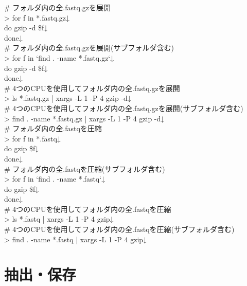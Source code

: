 \documentclass[titlepage,10pt,a4paper,english]{jsbook}
\newenvironment{cmd}{\begin{oframed}\raggedright\ttfamily\footnotesize\setlength{\baselineskip}{1.4em}}{\end{oframed}\vspace{-1em}}
\begin{document}
\begin{cmd}
\# フォルダ内の全.fastq.gzを展開\\
{\textgreater} for f in *.fastq.gz↓\\
do gzip -d \$f↓\\
done↓\\
\# フォルダ内の全.fastq.gzを展開(サブフォルダ含む)\\
{\textgreater} for f in `find . -name *.fastq.gz`↓\\
do gzip -d \$f↓\\
done↓\\
\# 4つのCPUを使用してフォルダ内の全.fastq.gzを展開\\
{\textgreater} ls *.fastq.gz | xargs -L 1 -P 4 gzip -d↓\\
\# 4つのCPUを使用してフォルダ内の全.fastq.gzを展開(サブフォルダ含む)\\
{\textgreater} find . -name *.fastq.gz | xargs -L 1 -P 4 gzip -d↓\\
\# フォルダ内の全.fastqを圧縮\\
{\textgreater} for f in *.fastq↓\\
do gzip \$f↓\\
done↓\\
\# フォルダ内の全.fastqを圧縮(サブフォルダ含む)\\
{\textgreater} for f in `find . -name *.fastq`↓\\
do gzip \$f↓\\
done↓\\
\# 4つのCPUを使用してフォルダ内の全.fastqを圧縮\\
{\textgreater} ls *.fastq | xargs -L 1 -P 4 gzip↓\\
\# 4つのCPUを使用してフォルダ内の全.fastqを圧縮(サブフォルダ含む)\\
{\textgreater} find . -name *.fastq | xargs -L 1 -P 4 gzip↓
\end{cmd}

\section{抽出・保存}
\end{document}
